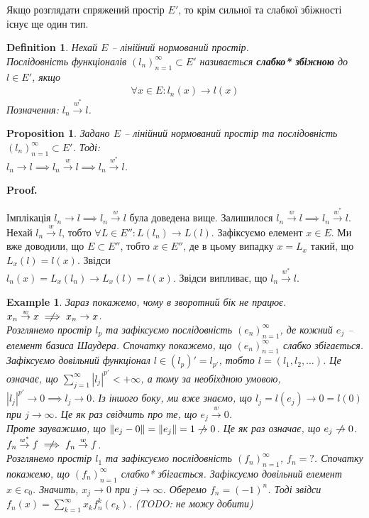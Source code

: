 \documentclass[a4paper, 10pt]{article}
\makeatletter
\theoremstyle{theoremdd}
\theoremstyle{theoremdd}
\newtheorem{definition}[theorem]{Definition}
\theoremstyle{theoremdd}
\theoremstyle{theoremdd}
\newtheorem{example}[theorem]{Example}
\theoremstyle{theoremdd}
\newtheorem{proposition}[theorem]{Proposition}
\theoremstyle{theoremdd}
\theoremstyle{theoremdd}
\theoremstyle{theoremdd}
\newcommand{\toweak}{\overset{w}{\to}}
\newcommand{\toweakstar}{\overset{w^*}{\to}}
\renewenvironment{proof}[1][Proof.\\]{\par
\pushQED{\hfill \qed}%
\normalfont \topsep6\p@\@plus6\p@\relax
\trivlist
\item\relax
{\bfseries
#1\@addpunct{.}}\hspace\labelsep\ignorespaces
}{%
\popQED\endtrivlist\@endpefalse
}
\makeatother
\begin{document}
Якщо розглядати спряжений простір $E'$, то крім сильної та слабкої збіжності існує ще один тип.

\begin{definition}
Нехай $E$ -- лінійний нормований простір.\\
Послідовність функціоналів $(l_n)_{n=1}^\infty \subset E'$ називається \textbf{слабко* збіжною} до $l \in E'$, якщо
\begin{align*}
\forall x \in E: l_n(x) \to l(x)
\end{align*}
Позначення: $l_n \toweakstar l$.
\end{definition}

\begin{proposition}
Задано $E$ -- лінійний нормований простір та послідовність $(l_n)_{n=1}^\infty \subset E'$. Тоді:\\
$l_n \to l \implies l_n \toweak l \implies l_n \toweakstar l$.
\end{proposition}

\begin{proof}
Імплікація $l_n \to l \implies l_n \toweak l$ була доведена вище. Залишилося $l_n \toweak l \implies l_n \toweakstar l$.\\
Нехай $l_n \toweak l$, тобто $\forall L \in E'': L(l_n) \to L(l)$. Зафіксуємо елемент $x \in E$. Ми вже доводили, що $E \subset E''$, тобто $x \in E''$, де в цьому випадку $x = L_x$ такий, що $L_x(l) = l(x)$. Звідси\\
$l_n(x) = L_x(l_n) \to L_x(l) = l(x)$. Звідси випливає, що $l_n \toweakstar l$.
\end{proof}

\begin{example}
Зараз покажемо, чому в зворотний бік не працює.
\bigskip \\
$x_n \toweak x \centernot\implies x_n \to x$.\\
Розглянемо простір $l_p$ та зафіксуємо послідовність $(e_n)_{n=1}^\infty$, де кожний $e_j$ -- елемент базиса Шаудера. Спочатку покажемо, що $(e_n)_{n=1}^\infty$ слабко збігається. Зафіксуємо довільний функціонал $l \in (l_p)' = l_{p'}$, тобто $l = (l_1,l_2,\dots)$. Це означає, що $\displaystyle\sum_{j=1}^\infty |l_j|^{p'} < + \infty$, а тому за необіхдною умовою, $|l_j|^{p'} \to 0 \implies l_j \to 0$. Із іншого боку, ми вже знаємо, що $l_j = l(e_j) \to 0 = l(0)$ при $j \to \infty$. Це як раз свідчить про те, що $e_j \toweak 0$.\\
Проте зауважимо, що $\|e_j - 0 \| = \|e_j\| = 1 \centernot\to 0$. Це як раз означає, що $e_j \centernot\to 0$.
\bigskip \\
$f_n \toweakstar f \centernot\implies f_n \toweak f$.\\
Розглянемо простір $l_1$ та зафіксуємо послідовність $(f_n)_{n=1}^\infty$, $f_n = ?$. Спочатку покажемо, що $(f_n)_{n=1}^\infty$ слабко* збігається. Зафіксуємо довільний елемент $x \in c_0$. Значить, $x_j \to 0$ при $j \to \infty$. Оберемо $f_n = (-1)^n$. Тоді звідси $f_n(x) = \displaystyle\sum_{k=1}^\infty x_k f_n^k(e_k)$. (TODO: не можу добити)
\end{example}
\end{document}
